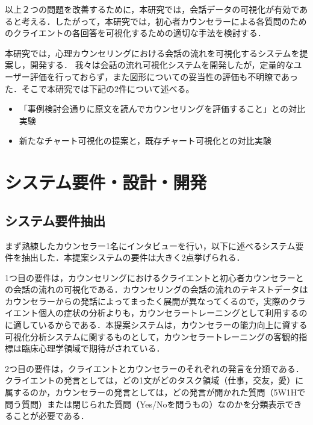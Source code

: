 \documentclass[shuuron]{kuee}
\begin{document}
以上２つの問題を改善するために，本研究では，会話データの可視化が有効であると考える．したがって，本研究では，初心者カウンセラーによる各質問のためのクライエントの各回答を可視化するための適切な手法を検討する．

本研究では，心理カウンセリングにおける会話の流れを可視化するシステムを提案し，開発する．
我々\cite{uetsuji}は会話の流れ可視化システムを開発したが，定量的なユーザー評価を行っておらず，また図形についての妥当性の評価も不明瞭であった．そこで本研究では下記の2件について述べる。
\begin{itemize}
  \item 「事例検討会通りに原文を読んでカウンセリングを評価すること」との対比実験
  \item 新たなチャート可視化の提案と，既存チャート可視化との対比実験
\end{itemize}



\section{システム要件・設計・開発}

\subsection{システム要件抽出}

まず熟練したカウンセラー1名にインタビューを行い，以下に述べるシステム要件を抽出した．本提案システムの要件は大きく2点挙げられる．

1つ目の要件は，カウンセリングにおけるクライエントと初心者カウンセラーとの会話の流れの可視化である．カウンセリングの会話の流れのテキストデータはカウンセラーからの発話によってまったく展開が異なってくるので，実際のクライエント個人の症状の分析よりも，カウンセラートレーニングとして利用するのに適しているからである．本提案システムは，カウンセラーの能力向上に資する可視化分析システムに関するものとして，カウンセラートレーニングの客観的指標は臨床心理学領域で期待がされている．

2つ目の要件は，クライエントとカウンセラーのそれぞれの発言を分類である．クライエントの発言としては，どの1文がどのタスク領域（仕事，交友，愛）に属するのか，カウンセラーの発言としては，どの発言が開かれた質問（5W1Hで問う質問）または閉じられた質問（Yes/Noを問うもの）なのかを分類表示できることが必要である．
\end{document}

